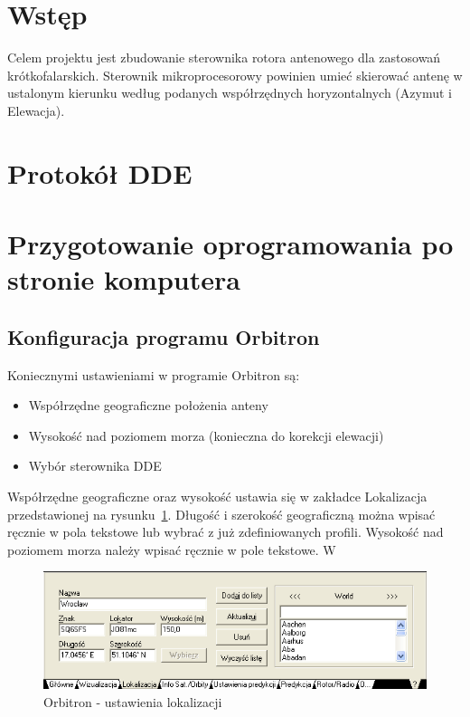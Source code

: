 \documentclass[12pt,a4paper]{article}
\begin{document}
	
	

	\tableofcontents
	\clearpage

	\section{Wstęp}
	Celem projektu jest zbudowanie sterownika rotora antenowego dla zastosowań krótkofalarskich. Sterownik mikroprocesorowy powinien umieć skierować antenę w ustalonym kierunku według podanych współrzędnych horyzontalnych (Azymut i Elewacja).

	\section{Protokół DDE}

	\section{Przygotowanie oprogramowania po stronie komputera}
		
		\subsection{Konfiguracja programu Orbitron}
		Koniecznymi ustawieniami w programie Orbitron są:
		\begin{itemize}
			\item Współrzędne geograficzne położenia anteny
			\item Wysokość nad poziomem morza (konieczna do korekcji elewacji)
			\item Wybór sterownika DDE
		\end{itemize}
		Współrzędne geograficzne oraz wysokość ustawia się w zakładce Lokalizacja przedstawionej na rysunku~\ref{fig:location_settings}. Długość i szerokość geograficzną można wpisać ręcznie w pola tekstowe lub wybrać z już zdefiniowanych profili. Wysokość nad poziomem morza należy wpisać ręcznie w pole tekstowe. W
		\begin{figure}[!htb]
			\begin{center}
				\includegraphics[scale=0.7]{screen1}
			\end{center}
			\caption{Orbitron - ustawienia lokalizacji}
			\label{fig:location_settings}
		\end{figure}
\end{document}
